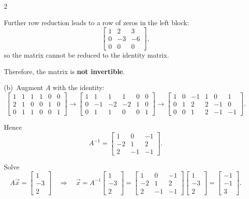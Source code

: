 \documentclass[8pt]{extarticle}
\begin{document}
\begin{multicols}{2}
\begin{tcolorbox}[title=Problem 12 — Original Statement and Solution]
Further row reduction leads to a row of zeros in the left block:
\[
\left[
\begin{array}{ccc}
1 & 2 & 3\\
0 & -3 & -6\\
0 & 0 & 0
\end{array}
\right],
\]
so the matrix cannot be reduced to the identity matrix.

Therefore, the matrix is \textbf{not invertible}.

\bigskip
\noindent
(b)\,
Augment \(A\) with the identity:
\[
\left[
\begin{array}{ccc|ccc}
1 & 1 & 1 & 1 & 0 & 0\\
2 & 1 & 0 & 0 & 1 & 0\\
0 & 1 & 1 & 0 & 0 & 1
\end{array}
\right]
\to
\left[
\begin{array}{ccc|ccc}
1 & 1 & 1 & 1 & 0 & 0\\
0 & -1 & -2 & -2 & 1 & 0\\
0 & 1 & 1 & 0 & 0 & 1
\end{array}
\right]
\to
\left[
\begin{array}{ccc|ccc}
1 & 0 & -1 & 1 & 0 & 1\\
0 & 1 & 2  & 2 & -1 & 0\\
0 & 0 & 1  & 2 & -1 & -1
\end{array}
\right].
\]

Hence
\[
A^{-1} =
\begin{bmatrix}
1 & 0 & -1\\
-2 & 1 & 2\\
2 & -1 & -1
\end{bmatrix}.
\]

Solve
\[
A\vec{x} =
\begin{bmatrix}
1\\ -3\\ 2
\end{bmatrix}
\quad\Rightarrow\quad
\vec{x} =
A^{-1}
\begin{bmatrix}
1\\ -3\\ 2
\end{bmatrix}
=
\begin{bmatrix}
1 & 0 & -1\\
-2 & 1 & 2\\
2 & -1 & -1
\end{bmatrix}
\begin{bmatrix}
1\\ -3\\ 2
\end{bmatrix}
=
\begin{bmatrix}
-1\\ -1\\ 3
\end{bmatrix}.
\]


\end{tcolorbox}
\end{multicols}
\end{document}
